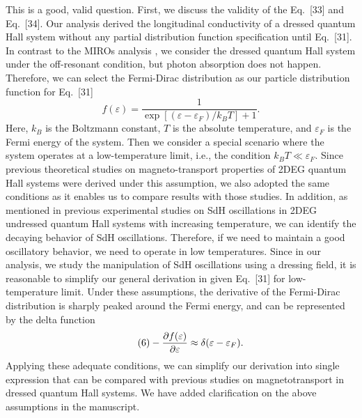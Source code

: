 \documentclass{article}
\begin{document}
This is a good, valid question. First, we discuss the validity of the Eq.~[33] and Eq.~[34]. Our analysis derived the longitudinal conductivity of a dressed quantum Hall system without any partial distribution function specification until Eq.~[31].
In contrast to the MIROs analysis \cite{dmitriev03,dmitriev05,dmitriev09}, we consider the dressed quantum Hall system under the off-resonant condition, but photon absorption does not happen. Therefore, we can select the Fermi-Dirac distribution as our particle distribution function for Eq.~[31]
\begin{equation} \tag{5}
  f(\varepsilon) = \frac{1}{\exp[(\varepsilon - \varepsilon_F)/k_B T]+1}.
\end{equation}
Here, $k_B$ is the Boltzmann constant, $T$ is the absolute temperature, and $\varepsilon_F$ is the Fermi energy of the system.
Then we consider a special scenario where the system operates at a low-temperature limit, i.e., the condition $k_BT \ll \varepsilon_F$.
Since previous theoretical studies \cite{wackerl20,dini16,endo09} on magneto-transport properties of 2DEG quantum Hall systems were derived under this assumption, we also adopted the same conditions as it enables us to compare results with those studies.
In addition, as mentioned in previous experimental studies on SdH oscillations \cite{zudov03,mani02,arapov02} in 2DEG undressed quantum Hall systems with increasing temperature, we can identify the decaying behavior of SdH oscillations.
Therefore, if we need to maintain a good oscillatory behavior, we need to operate in low temperatures.
Since in our analysis, we study the manipulation of SdH oscillations using a dressing field, it is reasonable to simplify our general derivation in given Eq.~[31] for low-temperature limit. Under these assumptions, the derivative of the Fermi-Dirac distribution is sharply peaked around the Fermi energy, and  can be represented by the delta function \cite{endo09}
\begin{equation} \tag{6}
  - \pdv{f(\varepsilon)}{\varepsilon} \approx \delta(\varepsilon - \varepsilon_F).
\end{equation}
Applying these adequate conditions, we can simplify our derivation into single expression that can be compared with previous studies \cite{wackerl20,dini16,endo09} on magnetotransport in dressed quantum Hall systems. We have added clarification on the above assumptions in the manuscript.
\end{document}
